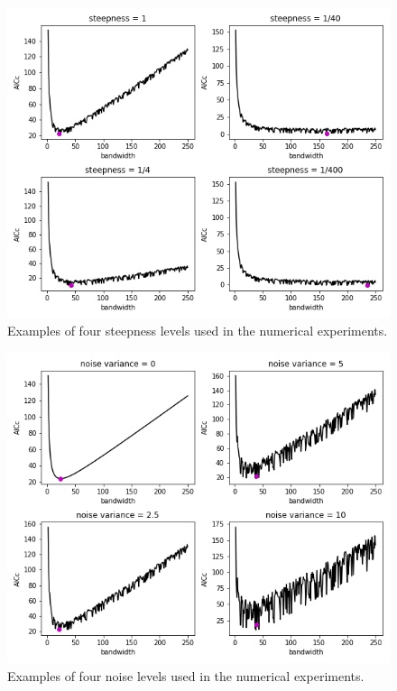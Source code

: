 \documentclass[letterpaper,12pt,twocolumn]{article}
\begin{document}
\begin{figure}
    \centering
    \includegraphics[width=\textwidth]{../figures/steep-curves.png}
    \caption{Examples of four steepness levels used in the numerical experiments.}
    \label{fig:steep-curves}
\end{figure}

\begin{figure}
    \centering
    \includegraphics[width=\textwidth]{../figures/noisy-curves.png}
    \caption{Examples of four noise levels used in the numerical experiments.}
    \label{fig:noisy-curves}
\end{figure}
\end{document}
